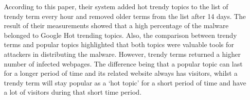 According to this paper, their system added hot trendy topics to the list of trendy term every hour and removed older terms from the list after 14 days. The result of their measurements showed that a high percentage of the malware belonged to Google Hot trending topics. Also, the comparison between trendy terms and popular topics highlighted that both topics were valuable tools for attackers in distributing the malware. However, trendy terms returned a higher number of infected webpages. The difference being that a popular topic can last for a longer period of time and its related website always has visitors, whilst a trendy term will stay popular as a ‘hot topic’ for a short period of time and have a lot of visitors during that short time period\cite{moore2011fashion}.
